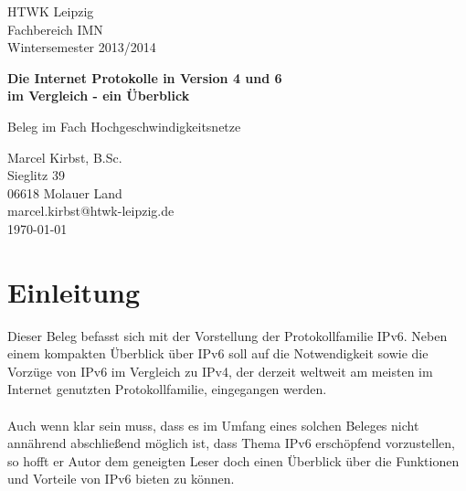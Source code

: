 \documentclass[a4paper,12pt]{scrartcl}
\begin{document}
 
\begin{titlepage}
\begin{small}
\vfill {HTWK Leipzig\\
Fachbereich IMN \\
Wintersemester 2013/2014}
\end{small}
 
\begin{center}
\begin{Large}
\vfill {\textsf{\textbf{
Die Internet Protokolle in Version 4 und 6\\
im Vergleich - ein \"Uberblick\\
}}}
\end{Large}
Beleg im Fach Hochgeschwindigkeitsnetze
\end{center}
 
\begin{small}
\vfill Marcel Kirbst, B.Sc. \\ Sieglitz 39 \\ 06618 Molauer Land \\
marcel.kirbst@htwk-leipzig.de\\
\today
\end{small}
 
\end{titlepage}
 
\tableofcontents
\thispagestyle{empty}
 
\clearpage
 
\onehalfspacing
 
\pagestyle{plain}
 
\section{Einleitung}
Dieser Beleg befasst sich mit der Vorstellung der Protokollfamilie IPv6. Neben einem kompakten Überblick über IPv6 soll auf die Notwendigkeit sowie die Vorzüge von IPv6 im Vergleich zu IPv4, der derzeit weltweit am meisten im Internet genutzten Protokollfamilie, eingegangen werden.\\
\\

Auch wenn klar sein muss, dass es im Umfang eines solchen Beleges nicht ann\"ahrend abschlie{\ss}end m\"oglich ist, dass Thema IPv6 ersch\"opfend vorzustellen, so hofft er Autor dem geneigten Leser doch einen \"Uberblick \"uber die Funktionen und Vorteile von IPv6 bieten zu k\"onnen.
\end{document}
